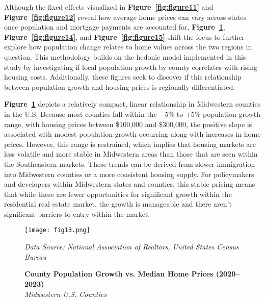 \documentclass[journal,article,submit,pdftex,moreauthors]{Definitions/mdpi}
\begin{document}
Although the fixed effects visualized in \textbf{Figure~\ref{fig:figure11}} and \textbf{Figure~\ref{fig:figure12}} reveal how average home prices can vary across states once population and mortgage payments are accounted for, \textbf{Figure~\ref{fig:figure13}}, \textbf{Figure~\ref{fig:figure14}}, and \textbf{Figure~\ref{fig:figure15}} shift the focus to further explore how population change relates to home values across the two regions in question. This methodology builds on the hedonic model implemented in this study by investigating if local population growth by county correlates with rising housing costs. Additionally, these figures seek to discover if this relationship between population growth and housing prices is regionally differentiated.
 
\textbf{Figure~\ref{fig:figure13}} depicts a relatively compact, linear relationship in Midwestern counties in the U.S. Because most counties fall within the $-5\%$ to $+5\%$ population growth range, with housing prices between \$100{,}000 and \$300{,}000, the positive slope is associated with modest population growth occurring along with increases in home prices. However, this range is restrained, which implies that housing markets are less volatile and more stable in Midwestern areas than those that are seen within the Southeastern markets. These trends can be derived from slower immigration into Midwestern counties or a more consistent housing supply. For policymakers and developers within Midwestern states and counties, this stable pricing means that while there are fewer opportunities for significant growth within the residential real estate market, the growth is manageable and there aren’t significant barriers to entry within the market.

\begin{figure}[H]
  \centering
  \texttt{[image: fig13.png]}
  \caption{\textbf{County Population Growth vs. Median Home Prices (2020–2023)}\\
  \textit{Midwestern U.S. Counties}}
  \label{fig:figure13}
  \vspace{1ex}
  {\footnotesize\textit{Data Source: National Association of Realtors, United States Census Bureau}}
\end{figure}
 
\end{document}
